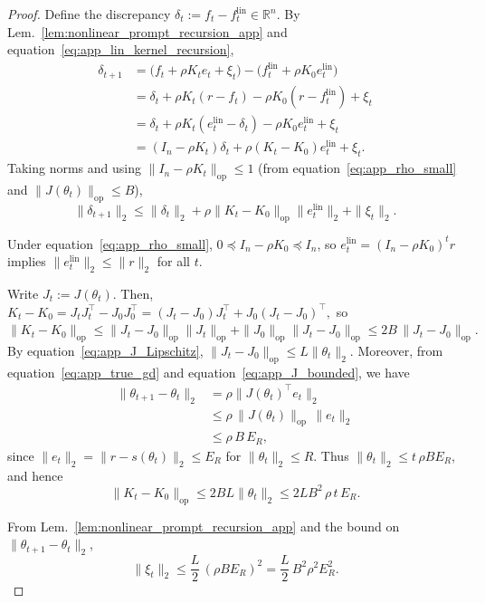 \documentclass[10pt,a4paper]{amsart}
\def\eqref#1{equation~\ref{#1}}
\begin{document}
\begin{proof}
Define the discrepancy $\delta_t:=f_t-f_t^{\mathrm{lin}}\in\mathbb{R}^n$. By
Lem.~\ref{lem:nonlinear_prompt_recursion_app} and \eqref{eq:app_lin_kernel_recursion},
\begin{align*}
\delta_{t+1}
&=
\bigl(f_t+\rho K_t e_t+\xi_t\bigr)-\bigl(f_t^{\mathrm{lin}}+\rho K_0 e_t^{\mathrm{lin}}\bigr) \\
&=
\delta_t+\rho K_t(r-f_t)-\rho K_0(r-f_t^{\mathrm{lin}})+\xi_t \\
&=
\delta_t+\rho K_t(e_t^{\mathrm{lin}}-\delta_t)-\rho K_0 e_t^{\mathrm{lin}}+\xi_t \\
&=
(I_n-\rho K_t)\delta_t + \rho (K_t-K_0)e_t^{\mathrm{lin}}+\xi_t.
\end{align*}
Taking norms and using $\|I_n-\rho K_t\|_{\mathrm{op}}\le 1$ (from \eqref{eq:app_rho_small} and $\|J(\theta_t)\|_{\mathrm{op}}\le B$),
\begin{equation}
\|\delta_{t+1}\|_2
\le
\|\delta_t\|_2 + \rho\|K_t-K_0\|_{\mathrm{op}}\|e_t^{\mathrm{lin}}\|_2+\|\xi_t\|_2.
\label{eq:app_delta_step}
\end{equation}

Under \eqref{eq:app_rho_small}, $0\preceq I_n-\rho K_0\preceq I_n$, so
$e_t^{\mathrm{lin}}=(I_n-\rho K_0)^t r$ implies $\|e_t^{\mathrm{lin}}\|_2\le \|r\|_2$ for all $t$.

Write $J_t:=J(\theta_t)$. Then, $K_t-K_0=J_tJ_t^\top-J_0J_0^\top=(J_t-J_0)J_t^\top + J_0(J_t-J_0)^\top,$
so
\(
\|K_t-K_0\|_{\mathrm{op}}
\le \|J_t-J_0\|_{\mathrm{op}}\|J_t\|_{\mathrm{op}}+\|J_0\|_{\mathrm{op}}\|J_t-J_0\|_{\mathrm{op}}
\le 2B\,\|J_t-J_0\|_{\mathrm{op}}.
\)
By \eqref{eq:app_J_Lipschitz}, $\|J_t-J_0\|_{\mathrm{op}}\le L\|\theta_t\|_2$. Moreover, from \eqref{eq:app_true_gd} and
\eqref{eq:app_J_bounded}, we have
\begin{align*}
   \|\theta_{t+1}-\theta_t\|_2 
   &=\rho\|J(\theta_t)^\top e_t\|_2  \\ 
   &\le \rho\,\|J(\theta_t)\|_{\mathrm{op}}\,\|e_t\|_2 \\
   &\le \rho\,B\,E_R,
\end{align*}
since $\|e_t\|_2=\|r-s(\theta_t)\|_2\le E_R$ for $\|\theta_t\|_2\le R$.
Thus $\|\theta_t\|_2\le t\,\rho B E_R$, and hence
\begin{equation}
    \|K_t-K_0\|_{\mathrm{op}} \le 2B  L\|\theta_t\|_2 \le 2LB^2\,\rho\,t\,E_R.
\label{eq:app_K_drift}
\end{equation}


From Lem.~\ref{lem:nonlinear_prompt_recursion_app} and the bound on $\|\theta_{t+1}-\theta_t\|_2$,
\begin{equation}
     \|\xi_t\|_2
     \le \frac{L}{2}\,(\rho B E_R)^2
     =\frac{L}{2}\,B^2\rho^2 E_R^2.
\label{eq:app_xi_final}
\end{equation}


\end{proof}
\end{document}
